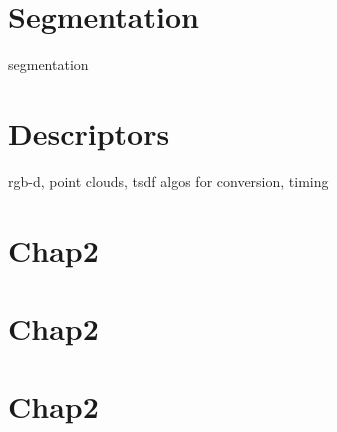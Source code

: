 
\chapter{Segmentation}
\label{cha:segmentation}

segmentation


\chapter{Descriptors}
\label{cha:descriptors}

rgb-d, point clouds, tsdf
algos for conversion, timing


\chapter{Chap2}
\label{cha:chap3}


\chapter{Chap2}
\label{cha:chap4}


\chapter{Chap2}
\label{cha:chap5}